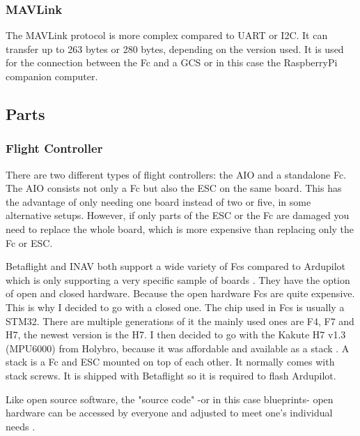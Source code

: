 \documentclass[svgnames]{article}
\begin{document}
	\subsubsection{MAVLink}
	The MAVLink protocol is more complex compared to \gls{UART} or \gls{I2C}. It can transfer up to 263 bytes or 280 bytes, depending on the version used. It is used for the connection between the \gls{Fc} and a \gls{GCS} or in this case the RaspberryPi companion computer.
	\subsection{Parts}
	
	\subsubsection[Fc]{Flight Controller}
	There are two different types of flight controllers: the \gls{AIO} and a standalone \gls{Fc}. The \gls{AIO} consists not only a \gls{Fc} but also the \gls{ESC} on the same board. This has the advantage of only needing one board instead of two or five, in some alternative setups. However, if only parts of the \gls{ESC} or the \gls{Fc} are damaged you need to replace the whole board, which is more expensive than replacing only the \gls{Fc} or \gls{ESC}. 
	
	Betaflight and \gls{INAV} both support a wide variety of \glspl{Fc} compared to Ardupilot which is only supporting a very specific sample of boards \cite{FcSupport}. They have the option of open and closed hardware. Because the open hardware \glspl{Fc} are quite expensive. This is why I decided to go with a closed one. The chip used in \glspl{Fc} is usually a STM32. There are multiple generations of it the mainly used ones are F4, F7 and H7, the newest version is the H7. I then decided to go with the Kakute H7 v1.3 (MPU6000) from Holybro, because it was affordable and available as a stack \cite{KakuteH7}. A stack is a \gls{Fc} and \gls{ESC} mounted on top of each other. It normally comes with stack screws. It is shipped with Betaflight so it is required to flash Ardupilot. 
	\begin{Explanation}
		\item Like open source software, the "source code" -or in this case blueprints- open hardware can be accessed by everyone and adjusted to meet one's individual needs \cite{openhardware}.
	\end{Explanation}
\end{document}
